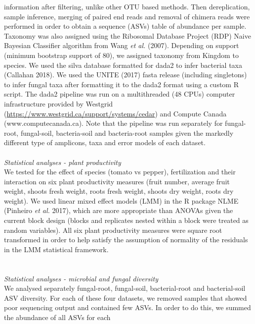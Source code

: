 \documentclass[11pt,]{article}
\begin{document}
information after filtering, unlike other OTU based methods. Then
dereplication, sample inference, merging of paired end reads and removal
of chimera reads were performed in order to obtain a sequence (ASVs)
table of abundance per sample. Taxonomy was also assigned using the
Ribosomal Database Project (RDP) Naive Bayesian Classifier algorithm
from Wang \emph{et al.} (2007). Depending on support (minimum bootstrap
support of 80), we assigned taxonomy from Kingdom to species. We used
the silva database formatted for dada2 to infer bacterial taxa (Callahan
2018). We used the UNITE (2017) fasta release (including singletons) to
infer fungal taxa after formatting it to the dada2 format using a custom
R script. The dada2 pipeline was run on a multithreaded (48 CPUs)
computer infrastructure provided by Westgrid
(\url{https://www.westgrid.ca/support/systems/cedar}) and Compute Canada
(www.computecanada.ca). Note that the pipeline was run separately for
fungal-root, fungal-soil, bacteria-soil and bacteria-root samples given
the markedly different type of amplicons, taxa and error models of each
dataset. ~\\
\hspace*{0.333em}\\
\emph{Statistical analyses - plant productivity}\\
We tested for the effect of species (tomato vs pepper), fertilization
and their interaction on six plant productivity measures (fruit number,
average fruit weight, shoots fresh weight, roots fresh weight, shoots
dry weight, roots dry weight). We used linear mixed effect models (LMM)
in the R package NLME (Pinheiro \emph{et al.} 2017), which are more
appropriate than ANOVAs given the current block design (blocks and
replicates nested within a block were treated as random variables). All
six plant productivity measures were square root transformed in order to
help satisfy the assumption of normality of the residuals in the LMM
statistical framework.\\
\hspace*{0.333em}\\
\hspace*{0.333em}\\
\emph{Statistical analyses - microbial and fungal diversity}\\
We analysed separately fungal-root, fungal-soil, bacterial-root and
bacterial-soil ASV diversity. For each of these four datasets, we
removed samples that showed poor sequencing output and contained few
ASVs. In order to do this, we summed the abundance of all ASVs for each
\end{document}
